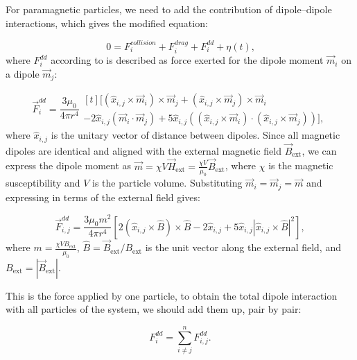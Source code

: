 For paramagnetic particles, we need to add the contribution of dipole–dipole interactions, which gives the modified equation:

\begin{equation}
  0 = F^{collision}_i + F^{drag}_i + F^{dd}_i + \eta(t)\text{,}
  \label{eq:langevindipole}
\end{equation}
where $F^{dd}_i$ according to \cite{yung1998analytic} is described as force exerted for the dipole moment $\vec{m}_i$ on a dipole $\vec{m}_j$:

\begin{equation}
  \label{eq:dipoledipoleforce}
\vec{F}^{dd}_i = \frac{3\mu_0}{4\pi r^4}
\begin{multlined}[t]
\bigl[ (\hat{x}_{i,j} \times \vec{m}_i) \times \vec{m}_j
    + (\hat{x}_{i,j} \times \vec{m}_j) \times \vec{m}_i \\
    - 2\hat{x}_{i,j}(\vec{m}_i \cdot \vec{m}_j)
    + 5\hat{x}_{i,j}((\hat{x}_{i,j} \times \vec{m}_i) \cdot (\hat{x}_{i,j} \times \vec{m}_j)) \bigr],
\end{multlined}
\end{equation}
where $\hat{x}_{i,j}$ is the unitary vector of distance between dipoles. Since all magnetic dipoles are identical and aligned with the external magnetic field $\vec{B}_{\text{ext}}$, we can express the dipole moment as $\vec{m} = \chi V \vec{H}_{\text{ext}} = \frac{\chi V}{\mu_0} \vec{B}_{\text{ext}}$, where $\chi$ is the magnetic susceptibility and $V$ is the particle volume. Substituting $\vec{m}_i = \vec{m}_j = \vec{m}$ and expressing in terms of the external field gives:

\begin{equation}
  \label{eq:dipoledipoleforce_Bext}
  \vec{F}^{dd}_{i,j} = \frac{3\mu_0 m^2}{4\pi r^4}
\left[ 2(\hat{x}_{i,j} \times \hat{B}) \times \hat{B} - 2\hat{x}_{i,j} + 5\hat{x}_{i,j}|\hat{x}_{i,j} \times \hat{B}|^2 \right],
\end{equation}
where $m = \frac{\chi V B_{\text{ext}}}{\mu_0}$, $\hat{B} = \vec{B}_{\text{ext}}/B_{\text{ext}}$ is the unit vector along the external field, and $B_{\text{ext}} = |\vec{B}_{\text{ext}}|$. 

This is the force applied by one particle, to obtain the total dipole interaction with all particles of the system, we should add them up, pair by pair:

\begin{equation}
  F^{dd}_i = \sum^{n}_{i \neq j} F^{dd}_{i,j}.  
  \label{eq:dipolesum}
\end{equation}


